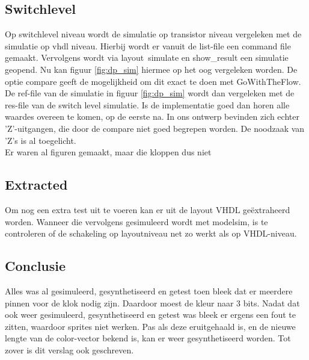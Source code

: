 \documentclass{scrartcl} %
\begin{document}

\subsection{Switchlevel}
Op switchlevel niveau wordt de simulatie op transistor niveau vergeleken met de simulatie op vhdl niveau. Hierbij wordt er vanuit de list-file een command file gemaakt. Vervolgens wordt via layout\ simulate en show\_result een simulatie geopend. Nu kan figuur \ref{fig:dp_sim} hiermee op het oog vergeleken worden. De optie compare geeft de mogelijkheid om dit exact te doen met GoWithTheFlow. De ref-file van de simulatie in figuur \ref{fig:dp_sim} wordt dan vergeleken met de res-file van de switch level simulatie. Is de implementatie goed dan horen alle waardes overeen te komen, op de eerste na. In ons ontwerp bevinden zich echter 'Z'-uitgangen, die door de compare niet goed begrepen worden. De noodzaak van 'Z's is al toegelicht. 
\\ \newline
Er waren al figuren gemaakt, maar die kloppen dus niet










\subsection{Extracted}
Om nog een extra test uit te voeren kan er uit de layout VHDL geëxtraheerd worden. Wanneer die vervolgens gesimuleerd wordt met modelsim, is te controleren of de schakeling op layoutniveau net zo werkt als op VHDL-niveau. 


\subsection{Conclusie}
Alles was al gesimuleerd, gesynthetiseerd en getest toen bleek dat er meerdere pinnen voor de klok nodig zijn. Daardoor moest de kleur naar 3 bits. Nadat dat ook weer gesimuleerd, gesynthetiseerd en getest was bleek er ergens een fout te zitten, waardoor sprites niet werken. Pas als deze eruitgehaald is, en de nieuwe lengte van de color-vector bekend is, kan er weer gesynthetiseerd worden. Tot zover is dit verslag ook geschreven. 
\end{document}
